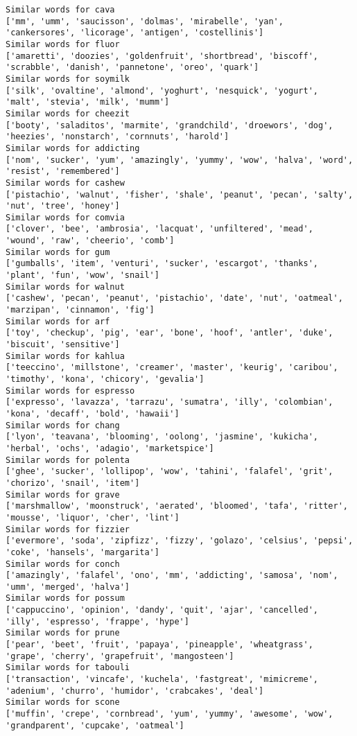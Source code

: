 \documentclass[11pt]{article}
\begin{document}
\begin{Verbatim}[commandchars=\\\{\}]
Similar words for cava
['mm', 'umm', 'saucisson', 'dolmas', 'mirabelle', 'yan', 'cankersores', 'licorage', 'antigen', 'costellinis']
Similar words for fluor
['amaretti', 'doozies', 'goldenfruit', 'shortbread', 'biscoff', 'scrabble', 'danish', 'pannetone', 'oreo', 'quark']
Similar words for soymilk
['silk', 'ovaltine', 'almond', 'yoghurt', 'nesquick', 'yogurt', 'malt', 'stevia', 'milk', 'mumm']
Similar words for cheezit
['booty', 'saladitos', 'marmite', 'grandchild', 'droewors', 'dog', 'heezies', 'nonstarch', 'cornnuts', 'harold']
Similar words for addicting
['nom', 'sucker', 'yum', 'amazingly', 'yummy', 'wow', 'halva', 'word', 'resist', 'remembered']
Similar words for cashew
['pistachio', 'walnut', 'fisher', 'shale', 'peanut', 'pecan', 'salty', 'nut', 'tree', 'honey']
Similar words for comvia
['clover', 'bee', 'ambrosia', 'lacquat', 'unfiltered', 'mead', 'wound', 'raw', 'cheerio', 'comb']
Similar words for gum
['gumballs', 'item', 'venturi', 'sucker', 'escargot', 'thanks', 'plant', 'fun', 'wow', 'snail']
Similar words for walnut
['cashew', 'pecan', 'peanut', 'pistachio', 'date', 'nut', 'oatmeal', 'marzipan', 'cinnamon', 'fig']
Similar words for arf
['toy', 'checkup', 'pig', 'ear', 'bone', 'hoof', 'antler', 'duke', 'biscuit', 'sensitive']
Similar words for kahlua
['teeccino', 'millstone', 'creamer', 'master', 'keurig', 'caribou', 'timothy', 'kona', 'chicory', 'gevalia']
Similar words for espresso
['expresso', 'lavazza', 'tarrazu', 'sumatra', 'illy', 'colombian', 'kona', 'decaff', 'bold', 'hawaii']
Similar words for chang
['lyon', 'teavana', 'blooming', 'oolong', 'jasmine', 'kukicha', 'herbal', 'ochs', 'adagio', 'marketspice']
Similar words for polenta
['ghee', 'sucker', 'lollipop', 'wow', 'tahini', 'falafel', 'grit', 'chorizo', 'snail', 'item']
Similar words for grave
['marshmallow', 'moonstruck', 'aerated', 'bloomed', 'tafa', 'ritter', 'mousse', 'liquor', 'cher', 'lint']
Similar words for fizzier
['evermore', 'soda', 'zipfizz', 'fizzy', 'golazo', 'celsius', 'pepsi', 'coke', 'hansels', 'margarita']
Similar words for conch
['amazingly', 'falafel', 'ono', 'mm', 'addicting', 'samosa', 'nom', 'umm', 'merged', 'halva']
Similar words for possum
['cappuccino', 'opinion', 'dandy', 'quit', 'ajar', 'cancelled', 'illy', 'espresso', 'frappe', 'hype']
Similar words for prune
['pear', 'beet', 'fruit', 'papaya', 'pineapple', 'wheatgrass', 'grape', 'cherry', 'grapefruit', 'mangosteen']
Similar words for tabouli
['transaction', 'vincafe', 'kuchela', 'fastgreat', 'mimicreme', 'adenium', 'churro', 'humidor', 'crabcakes', 'deal']
Similar words for scone
['muffin', 'crepe', 'cornbread', 'yum', 'yummy', 'awesome', 'wow', 'grandparent', 'cupcake', 'oatmeal']

\end{Verbatim}
\end{document}
